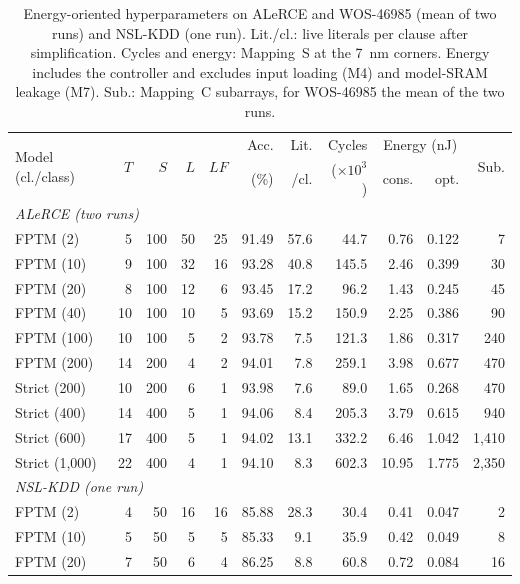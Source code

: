 \documentclass[preprint,review,12pt]{elsarticle}
\newcommand{\LF}{\mathit{LF}}
\newcommand{\wosnew}[1]{#1}   %
\begin{document}
\begin{table}[!htbp]
\centering
\caption{\wosnew{Energy-oriented hyperparameters on ALeRCE and WOS-46985 (mean of two runs) and NSL-KDD (one run). Lit./cl.: live literals per clause after simplification. Cycles and energy: Mapping~S at the 7~nm corners. Energy includes the controller and excludes input loading (M4) and model-SRAM leakage (M7). Sub.: Mapping~C subarrays, for WOS-46985 the mean of the two runs.}}
\label{tab:energyhp}
\footnotesize
\setlength{\tabcolsep}{3.5pt}
\textcolor{wosnewcolor}{%
\begin{tabular}{lrrrrrrrrrr}
\toprule
\multirow{2}{*}{Model (cl./class)} & \multirow{2}{*}{$T$} & \multirow{2}{*}{$S$} & \multirow{2}{*}{$L$} & \multirow{2}{*}{$\LF$} & Acc. & Lit. & Cycles & \multicolumn{2}{c}{Energy (nJ)} & \multirow{2}{*}{Sub.} \\
 & & & & & (\%) & /cl. & ($\times10^3$) & cons. & opt. & \\
\midrule
\multicolumn{11}{l}{\emph{ALeRCE (two runs)}}\\
FPTM (2) & 5 & 100 & 50 & 25 & 91.49 & 57.6 & 44.7 & 0.76 & 0.122 & 7 \\
FPTM (10) & 9 & 100 & 32 & 16 & 93.28 & 40.8 & 145.5 & 2.46 & 0.399 & 30 \\
FPTM (20) & 8 & 100 & 12 & 6 & 93.45 & 17.2 & 96.2 & 1.43 & 0.245 & 45 \\
FPTM (40) & 10 & 100 & 10 & 5 & 93.69 & 15.2 & 150.9 & 2.25 & 0.386 & 90 \\
FPTM (100) & 10 & 100 & 5 & 2 & 93.78 & 7.5 & 121.3 & 1.86 & 0.317 & 240 \\
FPTM (200) & 14 & 200 & 4 & 2 & 94.01 & 7.8 & 259.1 & 3.98 & 0.677 & 470 \\
Strict (200) & 10 & 200 & 6 & 1 & 93.98 & 7.6 & 89.0 & 1.65 & 0.268 & 470 \\
Strict (400) & 14 & 400 & 5 & 1 & 94.06 & 8.4 & 205.3 & 3.79 & 0.615 & 940 \\
Strict (600) & 17 & 400 & 5 & 1 & 94.02 & 13.1 & 332.2 & 6.46 & 1.042 & 1,410 \\
Strict (1,000) & 22 & 400 & 4 & 1 & 94.10 & 8.3 & 602.3 & 10.95 & 1.775 & 2,350 \\
\midrule
\multicolumn{11}{l}{\emph{NSL-KDD (one run)}}\\
FPTM (2) & 4 & 50 & 16 & 16 & 85.88 & 28.3 & 30.4 & 0.41 & 0.047 & 2 \\
FPTM (10) & 5 & 50 & 5 & 5 & 85.33 & 9.1 & 35.9 & 0.42 & 0.049 & 8 \\
FPTM (20) & 7 & 50 & 6 & 4 & 86.25 & 8.8 & 60.8 & 0.72 & 0.084 & 16 \\

\end{tabular}}
\end{table}
\end{document}
